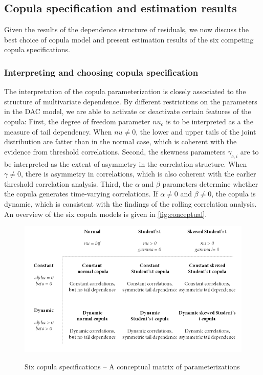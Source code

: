 \subsection{Copula specification and estimation results}
Given the results of the dependence structure of residuals, we now discuss the best choice of copula model and present estimation results of the six competing copula specifications.

\subsubsection{Interpreting and choosing copula specification}

The interpretation of the copula parameterization is closely associated to the structure of multivariate dependence. By different restrictions on the parameters in the DAC model, we are able to activate or deactivate certain features of the copula: First, the degree of freedom parameter $nu_c$ is to be interpreted as a the measure of tail dependency. When $nu \neq 0$, the lower and upper tails of the joint distribution are fatter than in the normal case, which is coherent with the evidence from threshold correlations. Second, the skewness parameters $\gamma_{c,i}$ are to be interpreted as the extent of asymmetry in the correlation structure. When $\gamma \neq 0$, there is asymmetry in correlations, which is also coherent with the earlier threshold correlation analysis. Third, the $\alpha$ and $\beta$ parameters determine whether the copula generates time-varying correlations. If $\alpha \neq 0$ and $\beta \neq 0$, the copula is dynamic, which is consistent with the findings of the rolling correlation analysis. An overview of the six copula models is given in \autoref{fig:conceptual}.

\begin{figure}[!ht]
  \centering
  \footnotesize
  \caption{Six copula specifications -- A conceptual matrix of parameterizations}
  \includegraphics[scale=1]{graphics/conceptual_matrix.png}
  \label{fig:conceptual}
\end{figure}

